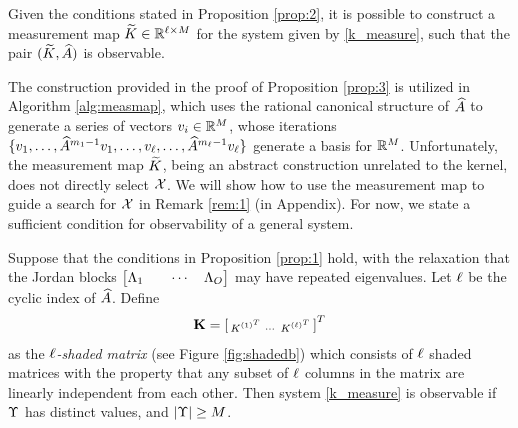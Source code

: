 \begin{proposition}\label{prop:3}
Given the conditions stated in Proposition \ref{prop:2}, it is possible to construct a measurement map $\widetilde{K} \in \mathbb{R}^{\ell\times M}$ for the system given by \eqref{k_measure}, such that the pair $(\widetilde{K}, \widehat{A})$ is observable.
\end{proposition}
The construction provided in the proof of Proposition \ref{prop:3} is utilized in Algorithm \ref{alg:measmap}, which uses the rational canonical structure of $\widehat{A}$ to generate a series of vectors $v_i\in\mathbb{R}^{M}$, whose iterations $\{v_1,\dots,\widehat{A}^{m_1-1}v_1,\dots,v_{\ell},\dots,\widehat{A}^{m_{\ell}-1}v_{\ell}\}$ generate a basis for $\mathbb{R}^{M}$.
Unfortunately, the measurement map $\widetilde{K}$, being an abstract construction unrelated to the kernel, does not directly select $\mathcal{X}$. We will show how to use the measurement map to guide a search for $\mathcal{X}$ in Remark \ref{rem:1} (in Appendix). For now, we state a sufficient condition for observability of a general system. 
\begin{theorem}\label{thm:1}
 Suppose that the conditions in Proposition \ref{prop:1} hold, with the relaxation that
 the Jordan blocks $\begin{bmatrix}\Lambda_1 & &\cdots & \Lambda_{O}\end{bmatrix}$ may have 
 repeated eigenvalues. Let $\ell$ be the cyclic index of $\widehat{A}$.
 Define 
 \begin{align}\eqlabel{empKShadFull}
  \empKShadFull = \left[\begin{smallmatrix}
                    \empK^{{(1)}^T} & 
                    \cdots &
                    \empK^{{(\minmeas)}^T}
                  \end{smallmatrix}\right]^T
 \end{align}
 as the \emph{$\ell$-shaded matrix} (see Figure \ref{fig:shadedb}) which consists of $\ell$ shaded matrices with the property that any subset of
 $\ell$
 columns in the matrix are linearly independent from each
 other. Then system \eqref{k_measure} is observable if $\Upsilon$ has distinct values, and $|\Upsilon| \geq M$.
\end{theorem}
